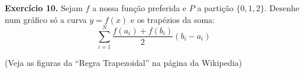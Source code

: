 \documentclass[oneside,12pt]{article}
\begin{document}
{\bf Exercício 10.} Sejam $f$ a nossa função preferida e $P$ a
partição $\{0,1,2\}$. Desenhe num gráfico só a curva $y=f(x)$ e os
trapézios da soma:
%
$$\sum_{i=1}^N \frac{f(a_i)+f(b_i)}{2} (b_i-a_i)$$

(Veja as figuras da ``Regra Trapezoidal'' na página da Wikipedia)



\newpage
















\end{document}
